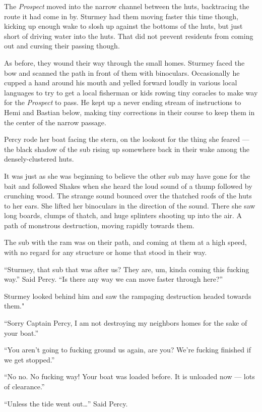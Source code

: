 \documentclass[]{scrbook}
\begin{document}
The \emph{Prospect} moved into the narrow channel between the huts,
backtracing the route it had come in by. Sturmey had them moving faster
this time though, kicking up enough wake to slosh up against the bottoms
of the huts, but just short of driving water into the huts. That did not
prevent residents from coming out and cursing their passing though.

As before, they wound their way through the small homes. Sturmey faced
the bow and scanned the path in front of them with binoculars.
Occasionally he cupped a hand around his mouth and yelled forward loudly
in various local languages to try to get a local fisherman or kids
rowing tiny coracles to make way for the \emph{Prospect} to pass. He
kept up a never ending stream of instructions to Hemi and Bastian below,
making tiny corrections in their course to keep them in the center of
the narrow passage.

Percy rode her boat facing the stern, on the lookout for the thing she
feared --- the black shadow of the sub rising up somewhere back in their
wake among the densely-clustered huts.

It was just as she was beginning to believe the other sub may have gone
for the bait and followed Shakes when she heard the loud sound of a
thump followed by crunching wood. The strange sound bounced over the
thatched roofs of the huts to her ears. She lifted her binoculars in the
direction of the sound. There she saw long boards, clumps of thatch, and
huge splinters shooting up into the air. A path of monstrous
destruction, moving rapidly towards them.

The sub with the ram was on their path, and coming at them at a high
speed, with no regard for any structure or home that stood in their way.

``Sturmey, that sub that was after us? They are, um, kinda coming this
fucking way.'' Said Percy. ``Is there any way we can move faster through
here?''

Sturmey looked behind him and saw the rampaging destruction headed
towards them."

``Sorry Captain Percy, I am not destroying my neighbors homes for the
sake of your boat.''

``You aren't going to fucking ground us again, are you? We're fucking
finished if we get stopped.''

``No no. No fucking way! Your boat was loaded before. It is unloaded now
--- lots of clearance.''

``Unless the tide went out\ldots{}'' Said Percy.
\end{document}
